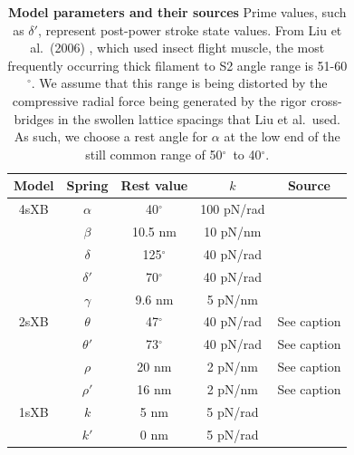 \documentclass[10pt]{article}
\newcommand{\citep}[1]{\cite{#1}} %
\newcommand{\citet}[1]{\cite{#1}}
\newcommand{\de}{$^\circ$} %
\begin{document}
\begin{table}[ht]
    \begin{center}
    \begin{tabular}[t]{|c|c|c|c|c|} \hline
    Model & Spring    & Rest value & $k$        & Source \\ \hline %
    4sXB  & $\alpha$  & 40\de      & 100 pN/rad & \citet{Liu2006}      \\ \hline
          & $\beta$   & 10.5 nm    & 10 pN/nm   & \citet{Liu2006}      \\ \hline
          & $\delta$  & 125\de     & 40 pN/rad  & \citet{Taylor1999}   \\ \hline
          & $\delta'$ & 70\de      & 40 pN/rad  & \citet{Taylor1999}   \\ \hline
          & $\gamma$  & 9.6 nm     & 5 pN/nm    & \citet{Houdusse2000} \\ \hline
    2sXB  & $\theta$  & 47\de      & 40 pN/rad  & See caption \\ \hline
          & $\theta'$ & 73\de      & 40 pN/rad  & See caption \\ \hline
          & $\rho$    & 20 nm      & 2 pN/nm    & See caption \\ \hline
          & $\rho'$   & 16 nm      & 2 pN/nm    & See caption \\ \hline
    1sXB  & $k$       & 5 nm       & 5 pN/rad   & \citet{Tanner2007} \\ \hline
          & $k'$      & 0 nm       & 5 pN/rad   & \citet{Tanner2007} \\ \hline
    \end{tabular}
    \caption{ 
	    \label{parameter_table}
	    \textbf{Model parameters and their sources} 
	    Prime values, such as $\delta'$, represent post-power stroke state values. 
	    From Liu et al.~(2006) \citep{Liu2006}, which used insect flight muscle, the most frequently occurring thick filament to S2 angle range is 51-60\de. 
	    We assume that this range is being distorted by the compressive radial force being generated by the rigor cross-bridges in the swollen lattice spacings that Liu et al.~used. 
	    As such, we choose a rest angle for $\alpha$ at the low end of the still common range of 50\de~to 40\de. 
}
\end{center}
\end{table}
\end{document}

